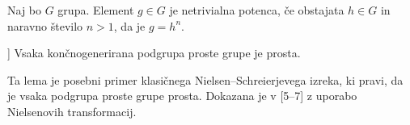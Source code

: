 \documentclass[mat1, tisk]{fmfdelo}
\numberwithin{equation}{section}  %
\newenvironment{skica}[1][Skica dokaza]{\begin{proof}[#1]}{\end{proof}}
\begin{document}
\begin{definicija}\label{def_netrivialna_potenca}
Naj bo $G$ grupa. Element $g \in  G$ je netrivialna potenca, če obstajata $h \in G$ in naravno število $n > 1$, da je $g = h^{n}$.
\end{definicija}

\begin{lema}[\cite{Lyndon_Schupp_2015}[str.~8, trditev 2.6]]\label{lem_uporaba_nielsen}
Vsaka končnogenerirana podgrupa proste grupe je prosta.   
\end{lema}


\noindent
Ta lema je posebni primer klasičnega Nielsen--Schreierjevega izreka, ki pravi, da je vsaka podgrupa proste grupe prosta. Dokazana je v \cite{Lyndon_Schupp_2015}[5--7] z uporabo Nielsenovih transformacij. 
\end{document}
